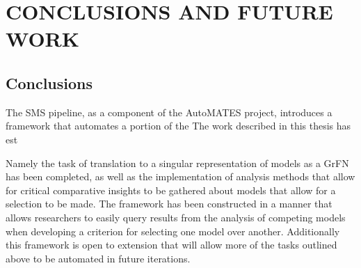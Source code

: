 \chapter{CONCLUSIONS AND FUTURE WORK\label{chapter:conc_and_future}}

\section{Conclusions\label{sec:conclusions}}



The SMS pipeline, as a component of the AutoMATES project, introduces a framework that automates a portion of the
The work described in this thesis has est

Namely the task of translation to a singular representation of models as a GrFN has been completed, as well as the implementation of analysis methods that allow for critical comparative insights to be gathered about models that allow for a selection to be made.
The framework has been constructed in a manner that allows researchers to easily query results from the analysis of competing models when developing a criterion for selecting one model over another.
Additionally this framework is open to extension that will allow more of the tasks outlined above to be automated in future iterations.

